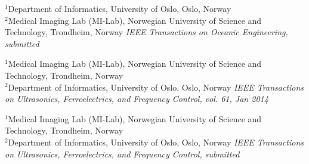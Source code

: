 \documentclass[10pt,b5paper,twoside]{book}
\begin{document}
\setcounter{section}{0}
\setcounter{chapter}{1}

\begin{bibunit}[ieeetr]

\newpage{}
\putbib[bibBackground]
\end{bibunit}

\setcounter{chapter}{0}

\begin{bibunit}[ieeetr]
{
	$^{1}$Department of Informatics, University of Oslo, Oslo, Norway\\
    	$^{2}$Medical Imaging Lab (MI-Lab), Norwegian University of Science and Technology, Trondheim, Norway
}
\noindent \textit{IEEE Transactions on Oceanic Engineering, submitted}
\putbib[bibCaponSonarGPU]
\end{bibunit}


\begin{bibunit}[ieeetr]
{
	$^{1}$Medical Imaging Lab (MI-Lab), Norwegian University of Science and Technology, Trondheim, Norway\\
    	$^{2}$Department of Informatics, University of Oslo, Oslo, Norway
}
\noindent \textit{IEEE Transactions on Ultrasonics, Ferroelectrics, and Frequency Control, vol. 61, Jan 2014}
%
\putbib[bibCaponCardiacGPU]
\end{bibunit}


\begin{bibunit}[ieeetr]
{
	$^{1}$Medical Imaging Lab (MI-Lab), Norwegian University of Science and Technology, Trondheim, Norway\\
    	$^{2}$Department of Informatics, University of Oslo, Oslo, Norway
}
\noindent \textit{IEEE Transactions on Ultrasonics, Ferroelectrics, and Frequency Control, submitted}
%
\putbib[bibCaponMovingObjects]
\end{bibunit}
\end{document}
